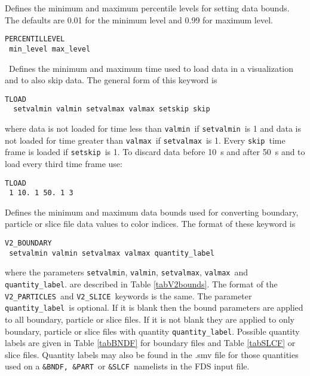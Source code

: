 \documentclass[11pt,twoside]{book}
\newcommand{\hitem}[1]{\item[{\bf #1} \hfill]}
\newcommand{\hitemNULL}[1]{}
\begin{document}
\hitemNULL{CACHE\_BOUNDARYDATA}

\hitemNULL{CACHE\_QDATA}

\hitemNULL{PATCHDATAOUT}

\hitem{PERCENTILELEVEL} Defines the minimum and maximum percentile levels for setting data bounds.
The defaults are 0.01 for the minimum level and 0.99 for maximum level.

\begin{lstlisting}
PERCENTILLEVEL
 min_level max_level
\end{lstlisting}

\hitemNULL{SLICEDATAOUT}

\hitemNULL{TIMEOFFSET}

\hitem{TLOAD}\ Defines the minimum and maximum time used to
load data in a visualization and to also skip data.
The general form of this keyword is
\begin{lstlisting}
TLOAD
  setvalmin valmin setvalmax valmax setskip skip
\end{lstlisting}

\noindent where data is not loaded for time
less than {\tt valmin}\ if {\tt setvalmin}\ is 1
and data is not loaded for time greater than {\tt valmax}\ if {\tt setvalmax}\ is 1.
Every {\tt skip}\ time frame is loaded if {\tt setskip}\ is 1.  To discard data before
10~s and after 50~s and to load every third time frame use:

\begin{lstlisting}
TLOAD
 1 10. 1 50. 1 3
\end{lstlisting}

\hitem{V2\_BOUNDARY, V2\_PARICLES, V2\_SLICE}Defines the minimum and maximum
data bounds used for converting boundary, particle or slice file data values to color indices.
The format of these keyword is
\begin{lstlisting}
V2_BOUNDARY
 setvalmin valmin setvalmax valmax quantity_label
\end{lstlisting}
where the parameters
{\tt setvalmin}, {\tt valmin}, {\tt setvalmax}, {\tt valmax}\ and {\tt quantity\_label}.
are described in Table \ref{tabV2bounds}.
The format of the {\tt V2\_PARTICLES}\ and {\tt V2\_SLICE}\ keywords is the same.
The parameter {\tt quantity\_label}\ is optional.  If it is blank then the bound
parameters are applied to all boundary, particle or slice files.
If it is not blank they
are applied to only boundary, particle or slice files with quantity {\tt quantity\_label}.
Possible quantity labels are given in Table \ref{tabBNDF} for boundary files and Table \ref{tabSLCF} or slice files.
Quantity labels may also be found in the .smv file for those quantities used
on a {\tt \&BNDF, \&PART}\ or {\tt \&SLCF}\ namelists in the FDS input file.
\end{document}
